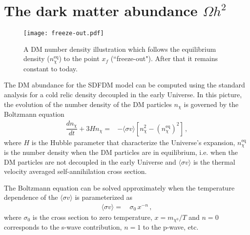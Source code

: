 \section{The dark matter abundance $\Omega h^2$ }
\label{sec:abundance}
%
\begin{figure}[h]
\begin{center}
\texttt{[image: freeze-out.pdf]}
\end{center}
\caption{A DM number density illustration which follows the equilibrium density ($n_{\chi}^{\text{eq}}$) to the point $x_f$ (``freeze-out"). After that it remains constant to today.}
\label{fig:freeze-out}
\end{figure}
%
The DM abundance for the SDFDM model can be computed using the standard analysis for a cold relic density decoupled in the early Universe. In this picture, the evolution of the number density of the DM particles $n_{\chi}$ is governed by the Boltzmann equation~\cite{Kolb:1990vq}
\begin{align}
\dfrac{dn_{\chi}}{dt}+3Hn_{\chi}=&-\langle \sigma v \rangle \left[n_{\chi}^2-(n_{\chi}^{\text{eq}})^2\right]\,,
\end{align}
where $H$ is the Hubble parameter that characterize the Universe's expansion, $n_{\chi}^{\text{eq}}$ is the number density when the DM particles are in equilibrium, i.e. when the DM particles are not decoupled in the early Universe and $\langle \sigma v \rangle$ is the thermal velocity averaged self-annihilation cross section.

The Boltzmann equation can be solved approximately when
the temperature dependence of the  $\langle \sigma v \rangle$ is parameterized as
%
\begin{align}
\langle\sigma v\rangle= &\, \sigma_0\, x^{-n}\,,
\end{align} 
%
where $\sigma_0$ is the cross section to zero temperature, $x=m_{\chi^0}/T$ and $n=0$ corresponds to the s-wave  contribution, $n=1$ to the p-wave, etc.

